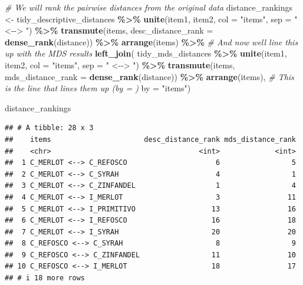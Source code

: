\documentclass[
]{book}
\newenvironment{Shaded}{\begin{snugshade}}{\end{snugshade}}
\newcommand{\AttributeTok}[1]{\textcolor[rgb]{0.13,0.29,0.53}{#1}}
\newcommand{\CommentTok}[1]{\textcolor[rgb]{0.56,0.35,0.01}{\textit{#1}}}
\newcommand{\FunctionTok}[1]{\textcolor[rgb]{0.13,0.29,0.53}{\textbf{#1}}}
\newcommand{\NormalTok}[1]{#1}
\newcommand{\OtherTok}[1]{\textcolor[rgb]{0.56,0.35,0.01}{#1}}
\newcommand{\SpecialCharTok}[1]{\textcolor[rgb]{0.81,0.36,0.00}{\textbf{#1}}}
\newcommand{\StringTok}[1]{\textcolor[rgb]{0.31,0.60,0.02}{#1}}
\begin{document}
\begin{Shaded}
\begin{Highlighting}[]
\CommentTok{\# We will rank the pairwise distances from the original data}
\NormalTok{distance\_rankings }\OtherTok{\textless{}{-}}
\NormalTok{  tidy\_descriptive\_distances }\SpecialCharTok{\%\textgreater{}\%}
  \FunctionTok{unite}\NormalTok{(item1, item2, }\AttributeTok{col =} \StringTok{"items"}\NormalTok{, }\AttributeTok{sep =} \StringTok{" \textless{}{-}{-}\textgreater{} "}\NormalTok{) }\SpecialCharTok{\%\textgreater{}\%}
  \FunctionTok{transmute}\NormalTok{(items,}
            \AttributeTok{desc\_distance\_rank =} \FunctionTok{dense\_rank}\NormalTok{(distance)) }\SpecialCharTok{\%\textgreater{}\%}
  \FunctionTok{arrange}\NormalTok{(items) }\SpecialCharTok{\%\textgreater{}\%}
  \CommentTok{\# And now we\textquotesingle{}ll line this up with the MDS results}
  \FunctionTok{left\_join}\NormalTok{(}
\NormalTok{    tidy\_mds\_distances }\SpecialCharTok{\%\textgreater{}\%}
      \FunctionTok{unite}\NormalTok{(item1, item2, }\AttributeTok{col =} \StringTok{"items"}\NormalTok{, }\AttributeTok{sep =} \StringTok{" \textless{}{-}{-}\textgreater{} "}\NormalTok{) }\SpecialCharTok{\%\textgreater{}\%}
      \FunctionTok{transmute}\NormalTok{(items,}
                \AttributeTok{mds\_distance\_rank =} \FunctionTok{dense\_rank}\NormalTok{(distance)) }\SpecialCharTok{\%\textgreater{}\%}
      \FunctionTok{arrange}\NormalTok{(items),}
    \CommentTok{\# This is the line that lines them up (\textasciigrave{}by = \textasciigrave{})}
    \AttributeTok{by =} \StringTok{"items"}\NormalTok{)}

\NormalTok{distance\_rankings}
\end{Highlighting}
\end{Shaded}

\begin{verbatim}
## # A tibble: 28 x 3
##    items                      desc_distance_rank mds_distance_rank
##    <chr>                                   <int>             <int>
##  1 C_MERLOT <--> C_REFOSCO                     6                 5
##  2 C_MERLOT <--> C_SYRAH                       4                 1
##  3 C_MERLOT <--> C_ZINFANDEL                   1                 4
##  4 C_MERLOT <--> I_MERLOT                      3                11
##  5 C_MERLOT <--> I_PRIMITIVO                  13                16
##  6 C_MERLOT <--> I_REFOSCO                    16                18
##  7 C_MERLOT <--> I_SYRAH                      20                20
##  8 C_REFOSCO <--> C_SYRAH                      8                 9
##  9 C_REFOSCO <--> C_ZINFANDEL                 11                10
## 10 C_REFOSCO <--> I_MERLOT                    18                17
## # i 18 more rows
\end{verbatim}
\end{document}
